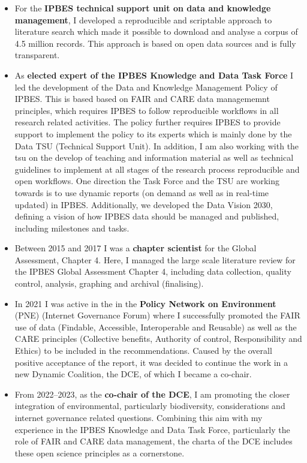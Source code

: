 \documentclass[a4paper]{article}
\begin{document}
\begin{itemize}[leftmargin=1.1in]

\item For the \textbf{IPBES technical support unit on data and knowledge management},
	I developed a reproducible and scriptable approach to literature search 
	which made it possible to download and analyse a corpus of 4.5 million 
	records. This approach is based on open data sources and is fully transparent. 

\item As \textbf{elected expert of the IPBES Knowledge and Data Task
	Force} I led the development of the Data and Knowledge Management
	Policy of IPBES. This is based based on FAIR and CARE data
	managememnt principles, which requires IPBES to follow reproducible
	workflows in all research related activities. The policy further
	requires IPBES to provide support to implement the policy to its
	experts which is mainly done by the Data TSU (Technical Support
	Unit). In addition, I am also working with the tsu on the develop of
	teaching and information material as well as technical guidelines to
	implement at all stages of the research process reproducible and open
	workflows. One direction the Task Force and the TSU are working
	towards is to use dynamic reports (on demand as well as in real-time
	updated) in IPBES. Additionally, we developed the Data Vision 2030, 
	defining a vision of how IPBES data should be managed and published, 
	including milestones and tasks. 

\item Between 2015 and 2017 I was a \textbf{chapter scientist} for the
	Global Assessment, Chapter 4. Here, I managed the large scale
	literature review for the IPBES Global Assessment Chapter 4,
	including data collection, quality control, analysis, graphing and
	archival (finalising).

\item In 2021 I was active in the  in the \textbf{Policy Network on
	Environment} (PNE) (Internet Governance Forum) where I successfully
	promoted the FAIR use of data (Findable, Accessible, Interoperable
	and Reusable) as well as the CARE principles (Collective benefits,
	Authority of control, Responsibility and Ethics) to be included in
	the recommendations. Caused by the overall positive acceptance of the
	report, it was decided to continue the work in a new Dynamic
	Coalition, the DCE, of which I became a co-chair.

\item From 2022--2023, as the \textbf{co-chair of the DCE}, I am
	promoting the closer integration of environmental, particularly
	biodiversity, considerations and internet governance related
	questions. Combining this aim with my experience in the IPBES
	Knowledge and Data Task Force, particularly the role of FAIR and CARE
	data management, the charta of the DCE includes these open science
	principles as a cornerstone.

\end{itemize}
\end{document}
